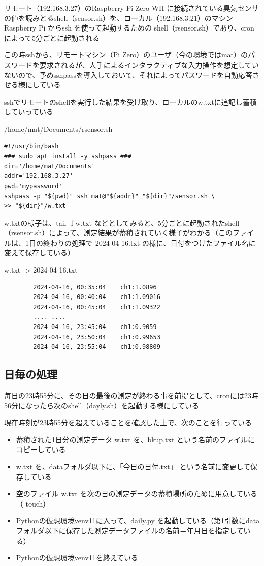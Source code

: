 \documentclass[12pt,a4paper,uplatex]{jsarticle}
\begin{document}
リモート（192.168.3.27）のRaspberry Pi Zero WH に接続されている臭気センサの値を読みとるshell（sensor.sh）を、ローカル（192.168.3.21）のマシンRaspberry Pi からssh を使って起動するための shell（rsensor.sh）であり、cronによって5分ごとに起動される

この時sshから、リモートマシン（Pi Zero）のユーザ（今の環境ではmat）のパスワードを要求されるが、人手によるインタラクティブな入力操作を想定していないので、予めsshpassを導入しておいて、それによってパスワードを自動応答させる様にしている

sshでリモートのshellを実行した結果を受け取り、ローカルのw.txtに追記し蓄積していっている

\begin{itembox}[l]{/home/mat/Documents/rsensor.sh}
	\begin{verbatim}
#!/usr/bin/bash
### sudo apt install -y sshpass ###
dir='/home/mat/Documents'
addr='192.168.3.27'
pwd='mypassword'
sshpass -p "${pwd}" ssh mat@"${addr}" "${dir}"/sensor.sh \
>> "${dir}"/w.txt
	\end{verbatim}
\end{itembox}

w.txtの様子は、tail -f w.txt などとしてみると、5分ごとに起動されたshell（rsensor.sh）によって、測定結果が蓄積されていく様子がわかる（このファイルは、1日の終わりの処理で 2024-04-16.txt の様に、日付をつけたファイル名に変えて保存している）

\begin{itembox}[l]{w.txt -> 2024-04-16.txt}
	\begin{verbatim}
		2024-04-16, 00:35:04	ch1:1.0896
		2024-04-16, 00:40:04	ch1:1.09016
		2024-04-16, 00:45:04	ch1:1.09322
		.... ....
		2024-04-16, 23:45:04	ch1:0.9059
		2024-04-16, 23:50:04	ch1:0.99653
		2024-04-16, 23:55:04	ch1:0.98809
	\end{verbatim}
\end{itembox}

\subsection{日毎の処理}

毎日の23時55分に、その日の最後の測定が終わる事を前提として、cronには23時56分になったら次のshell（dayly.sh）を起動する様にしている

現在時刻が23時55分を超えていることを確認した上で、次のことを行っている
\begin{itemize}
	\item 蓄積された1日分の測定データ w.txt を、bkup.txt という名前のファイルにコピーしている
	\item w.txt を、dataフォルダ以下に、「今日の日付.txt」 という名前に変更して保存している
	\item 空のファイル w.txt を次の日の測定データの蓄積場所のために用意している（ touch）
	\item Pythonの仮想環境venv11に入って、daily.py を起動している（第1引数にdataフォルダ以下に保存した測定データファイルの名前＝年月日を指定している）
	\item Pythonの仮想環境venv11を終えている
\end{itemize}
\end{document}
